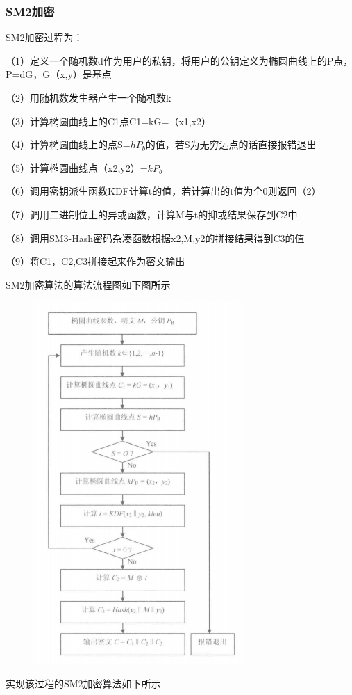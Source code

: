 \documentclass[a4paper,11pt,UTF8]{ctexart}
\newcommand{\bottomcaption}{%
\setlength{\abovecaptionskip}{6pt}%
\setlength{\belowcaptionskip}{6pt}%
\caption}
\newcommand{\xiaowuhao}{\fontsize{9pt}{\baselineskip}\selectfont}   %
\begin{document}
        \subsubsection{SM2加密}
            SM2加密过程为：\par
            （1）定义一个随机数d作为用户的私钥，将用户的公钥定义为椭圆曲线上的P点，P=dG，G（x,y）是基点\par
            （2）用随机数发生器产生一个随机数k\par
            （3）计算椭圆曲线上的C1点C1=kG=（x1,x2）\par
            （4）计算椭圆曲线上的点S=$hP_{b}$的值，若S为无穷远点的话直接报错退出\par
            （5）计算椭圆曲线点（x2,y2）=$kP_{b}$\par
            （6）调用密钥派生函数KDF计算t的值，若计算出的t值为全0则返回（2）\par
            （7）调用二进制位上的异或函数，计算M与t的抑或结果保存到C2中\par
            （8）调用SM3-Hash密码杂凑函数根据x2,M,y2的拼接结果得到C3的值\par
            （9）将C1，C2,C3拼接起来作为密文输出\par
            SM2加密算法的算法流程图如下图所示
            \begin{figure}[H]
                \centering
                \includegraphics[width=8cm]{SM2加密流程.png}
                \bottomcaption{\xiaowuhao{SM2加密流程}}
            \end{figure}
            实现该过程的SM2加密算法如下所示
            
\end{document}
